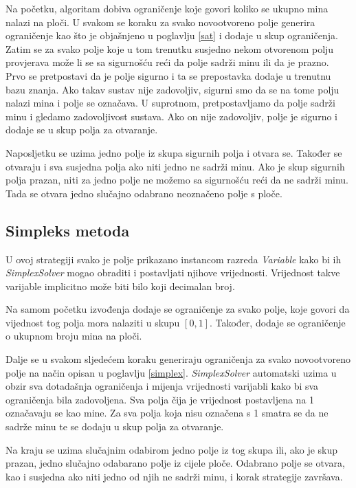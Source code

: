 \documentclass{article}
\numberwithin{figure}{section}
\numberwithin{table}{section}
\begin{document}
Na početku, algoritam dobiva ograničenje koje govori koliko se ukupno mina nalazi na ploči.
U svakom se koraku za svako novootvoreno polje generira ograničenje kao što je objašnjeno u
poglavlju \ref{sat} i dodaje u skup ograničenja. Zatim se za svako polje koje u tom trenutku
susjedno nekom otvorenom polju provjerava može li se sa sigurnošću reći da polje sadrži minu ili da
je prazno. Prvo se pretpostavi da je polje sigurno i ta se prepostavka dodaje u trenutnu bazu
znanja. Ako takav sustav nije zadovoljiv, sigurni smo da se na tome polju nalazi mina i polje se
označava. U suprotnom, pretpostavljamo da polje sadrži minu i gledamo zadovoljivost sustava. Ako on
nije zadovoljiv, polje je sigurno i dodaje se u skup polja za otvaranje.

Naposljetku se uzima jedno polje iz skupa sigurnih polja i otvara se. Također se otvaraju i sva susjedna polja ako niti jedno ne sadrži minu. Ako je skup sigurnih polja prazan, niti za jedno polje ne možemo sa sigurnošću reći da ne sadrži minu. Tada se otvara jedno slučajno odabrano neoznačeno polje s ploče.

\subsection{Simpleks metoda}

U ovoj strategiji svako je polje prikazano instancom razreda \textit{Variable} kako bi ih \textit{SimplexSolver} mogao obraditi i postavljati njihove vrijednosti. Vrijednost takve varijable implicitno može biti bilo koji decimalan broj.

Na samom početku izvođenja dodaje se ograničenje za svako polje, koje govori da vijednost tog polja mora nalaziti u skupu $[0, 1]$. Također, dodaje se ograničenje o ukupnom broju mina na ploči.

Dalje se u svakom sljedećem koraku generiraju ograničenja za svako novootvoreno polje na način opisan u poglavlju \ref{simplex}.
\textit{SimplexSolver} automatski uzima u obzir sva dotadašnja ograničenja i mijenja vrijednosti varijabli kako bi sva ograničenja bila zadovoljena. Sva polja čija je vrijednost postavljena na 1 označavaju se kao mine. Za sva polja koja nisu označena s 1 smatra se da ne sadrže minu te se dodaju u skup polja za otvaranje.

Na kraju se uzima slučajnim odabirom jedno polje iz tog skupa ili, ako je skup prazan, jedno slučajno odabarano polje iz cijele ploče. Odabrano polje se otvara, kao i susjedna ako niti jedno od njih ne sadrži minu, i korak strategije završava.
\end{document}
